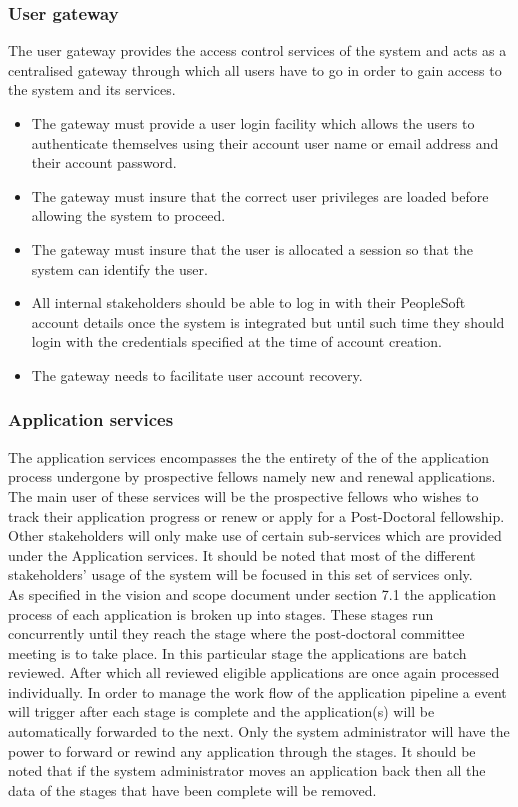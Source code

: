 \documentclass[12pt]{article}
\begin{document}
\subsubsection{User gateway}
	The user gateway provides the access control services of the system and acts as a centralised gateway through which all users have to go in order to gain access to the system and its services. 
	\begin{itemize}
		\item The gateway must provide a user login facility which allows the users to authenticate themselves using their account user name or email address and their account password.
		\item The gateway must insure that the correct user privileges are loaded before allowing the system to proceed.
		\item The gateway must insure that the user is allocated a session so that the system can identify the user.
		\item All internal stakeholders should be able to log in with their PeopleSoft account details once the system is integrated but until such time they should login with the credentials specified at the time of account creation. 
		\item The gateway needs to facilitate user account recovery.
		 
	\end{itemize}

\subsubsection{Application services}
	The application services encompasses the the entirety of the of the application process undergone by prospective fellows namely new and renewal applications.\\
	The main user of these services will be the prospective fellows who wishes to track their application progress or renew or apply for a Post-Doctoral fellowship. Other stakeholders will only make use of certain sub-services which are provided under the Application services. It should be noted that most of the different stakeholders' usage of the system will be focused in this set of services only. \\As specified in the vision and scope document under section 7.1 the application process of each application is broken up into stages. These stages run concurrently until they reach the stage where the post-doctoral committee meeting is to take place. In this particular stage the applications are batch reviewed. After which all reviewed eligible applications are once again processed individually. In order to manage the work flow of the application pipeline a event will trigger after each stage is complete and the application(s) will be automatically forwarded to the next. Only the system administrator will have the power to forward or rewind any application through the stages. It should be noted that if the system administrator moves an application back then all the data of the stages that have been complete will be removed.
	
\end{document}
